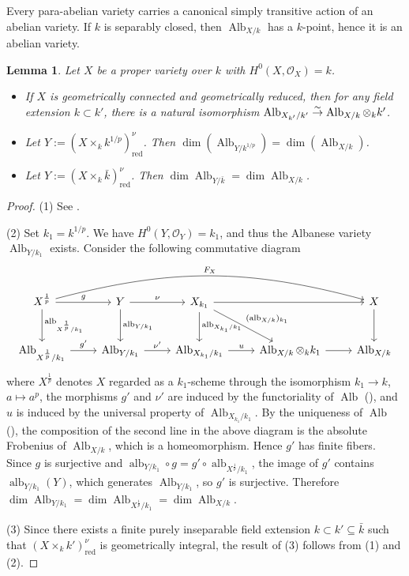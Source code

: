 \documentclass[10pt,abstract=true]{scrartcl}
\numberwithin{equation}{section}
\newtheorem{lemma}[theorem]{Lemma}
\theoremstyle{definition}
\theoremstyle{remark}
\DeclareMathOperator\Alb{Alb}
\DeclareMathOperator\alb{alb}
\begin{document}
Every para-abelian variety carries a canonical simply transitive action of an abelian variety.
If $k$ is separably closed, then $\Alb_{X/k}$ has a $k$-point, hence it is an abelian variety.

\begin{lemma}\label{prop:Alb-eq-dim}%
  Let $X$ be a proper variety over $k$ with $H^0(X,\mathcal O_X) = k$.
  \begin{itemize}
    \item[\textup{(1)}] If $X$ is geometrically connected and geometrically reduced, 
      then for any field extension $k \subset k'$, there is a natural isomorphism $\Alb_{X_{k'}/k'} \buildrel\sim\over\to \Alb_{X/k} \otimes_k k'$.
    \item[\textup{(2)}] Let $Y := (X\times_k k^{1/p})_{\mathrm{red}}^\nu$. Then $\dim(\Alb_{Y/k^{1/p}}) = \dim(\Alb_{X/k})$.
    \item[\textup{(3)}] Let $Y := (X\times_k \bar k)_{\mathrm{red}}^\nu$.  Then $\dim\Alb_{Y/\bar k} = \dim\Alb_{X/k}$.
  \end{itemize}
\end{lemma}
\begin{proof}
  (1) See \cite[Theorem~3.2]{AC-MV-25}.

  (2)
  Set $k_1 = k^{1/p}$.
  We have $H^0(Y,\mathcal O_{Y}) = k_1$, and thus the Albanese variety $\Alb_{Y/k_1}$ exists.
  Consider the following commutative diagram \[
    \begin{tikzcd}[row sep = large]
      X^{\frac1p} \ar[rrrr,bend left=15,"F_X"]\rar{g}\dar{\alb_{X^{\frac1p}/k_1}} & Y \rar{\nu}\dar{\alb_{Y/k_1}} & X_{k_1} \ar[rr]\dar{\alb_{X_{k_1}/k_1}}\ar[dr,"(\alb_{X/k})_{k_1}"] && X \dar \\
      \Alb_{X^{\frac1p}/k_1}\rar{g'} & \Alb_{Y/k_1} \rar{\nu'} & \Alb_{X_{k_1}/k_1} \rar{u} & \Alb_{X/k} \otimes_k k_1 \ar[r] & \Alb_{X/k}
    \end{tikzcd}
  \]
  where $X^{\frac1p}$ denotes $X$ regarded as a $k_1$-scheme through the isomorphism $k_1\to k$, $a\mapsto a^p$, the morphisms $g'$ and $\nu'$ are induced by the functoriality of $\Alb$ (\cite[Corollary~10.4]{Laurent-Schroer-2024}), and $u$ is induced by the universal property of $\Alb_{X_{k_1}/k_1}$.
  By the uniqueness of $\Alb$ (\cite[Corollary~10.4]{Laurent-Schroer-2024}), the composition of the second line in the above diagram is the absolute Frobenius of $\Alb_{X/k}$, which is a homeomorphism.
  Hence $g'$ has finite fibers.
  Since $g$ is surjective and $\alb_{Y/k_1}\circ g=g'\circ\alb_{X^{\frac1p}/k_1}$, the image of $g'$ contains $\alb_{Y/k_1}(Y)$, which generates $\Alb_{Y/k_1}$, so $g'$ is surjective.
  Therefore $\dim\Alb_{Y/k_1}=\dim\Alb_{X^{\frac1p}/k_1}=\dim\Alb_{X/k}$.

  (3) Since there exists a finite purely inseparable field extension $k \subset k'\subseteq\bar k$ such that $(X \times_k k')_{\mathrm{red}}^\nu$ is geometrically integral, the result of (3) follows from (1) and (2).
\end{proof}
\end{document}
